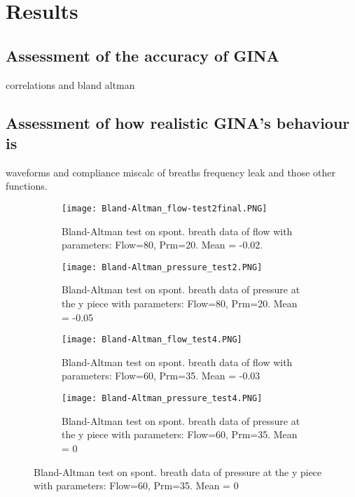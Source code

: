 \documentclass[12pt, openany, oneside]{book}
\begin{document}
\section{Results}

\subsection{Assessment of the accuracy of GINA}
correlations and bland altman

\subsection{Assessment of how realistic GINA's behaviour is}

waveforms and compliance
miscalc of breaths frequency
leak and those other functions.

\begin{figure}
	\begin{subfigure}[t]{0.49\textwidth}
		\centering
		\texttt{[image: Bland-Altman\_flow-test2final.PNG]}		
		\caption{Bland-Altman test on spont. breath data of flow with parameters: Flow=80, Prm=20. Mean = -0.02.}
		\label{fig:baf2}
	\end{subfigure}%
	\hfill
	\begin{subfigure}[t]{0.49\textwidth}
		\centering
		\texttt{[image: Bland-Altman\_pressure\_test2.PNG]}		
		\caption{Bland-Altman test on spont. breath data of pressure at the y piece with parameters: Flow=80, Prm=20. Mean = -0.05}
		\label{fig:bap2}
	\end{subfigure}
	\medskip
	\begin{subfigure}[t]{0.49\textwidth}
		\centering
		\texttt{[image: Bland-Altman\_flow\_test4.PNG]}		
		\caption{Bland-Altman test on spont. breath data of flow with parameters: Flow=60, Prm=35. Mean = -0.03}
		\label{fig:baf4}
	\end{subfigure}%
	\hfill
	\begin{subfigure}[t]{0.49\textwidth}
		\centering
		\texttt{[image: Bland-Altman\_pressure\_test4.PNG]}		
		\caption{Bland-Altman test on spont. breath data of pressure at the y piece with parameters: Flow=60, Prm=35. Mean = 0}
		\label{fig:bap4}
	\end{subfigure}
\end{figure}
\end{document}
